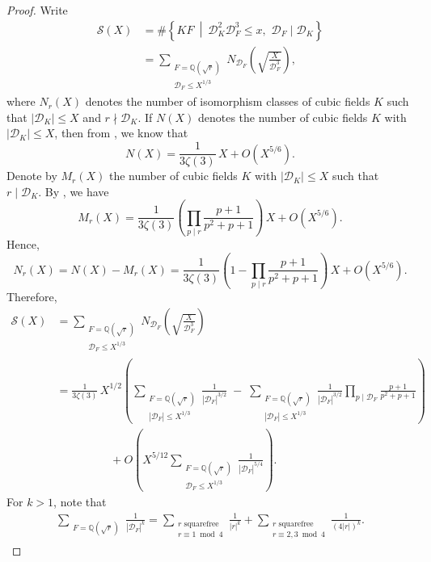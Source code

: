 \documentclass[11pt,reqno]{amsart}
\newcommand{\Q}{\mathbb{Q}}
\newcommand{\cD}{\mathcal{D}}
\newcommand{\cS}{\mathcal{S}}
\theoremstyle{definition}
\theoremstyle{remark}
\begin{document}
\begin{proof}
Write
\begin{align*}
       \cS(X) &= \#\left\{ KF \ \middle| \ \cD_K^2 \cD_F^3 \leq x ,\,\, \cD_F \mid \cD_K\right\} \\
    &=  \sum_{\substack{ F=\Q(\sqrt{r}) \\ \cD_F  \leq X^{1/3}}} N_{\cD_F}\left( \sqrt{ \frac{X}{\cD_F^3}}\right),
\end{align*}
where  $N_r(X)$ denotes the number of isomorphism classes of cubic fields $K$ such that $|\cD_K| \leq X$ and $r \nmid \cD_K$. If $N(X)$ denotes the number of cubic fields $K$ with $|\cD_K|\leq X$, then from \cite[Theorem 1.1]{countingcubicfields}, we know that 
$$
    N(X) = \frac{1}{3\zeta(3)} \, X + O\left(X^{5/6}\right).
$$
Denote by $M_r(X)$ the number of cubic fields $K$ with $|\cD_K|\leq X$ such that $r\mid \cD_K$.  By \cite[Theorem 1.3]{countingcubicfields}, we have 
\[
M_r(X) =  \frac{1}{3\zeta(3)} \left(\prod_{p\mid r}\frac{p+1}{p^2 + p +1}\right)\, X + O\left(X^{5/6}\right).
\]
Hence,
$$
    N_r(X) = N(X) - M_r(X) = \frac{1}{3\zeta(3)} \left(1-\prod_{p\mid r}\frac{p+1}{p^2 + p +1}\right)\, X + O\left(X^{5/6}\right).
$$
Therefore,
\begin{align*}
\cS(X)
  &= 
     \sum_{\substack{F=\Q(\sqrt{r}) \\ \cD_F \le X^{1/3}}}
        N_{\cD_F}\!\left( \sqrt{\frac{X}{\cD_F^{3}}} \right)\\[2pt]  
  &= \frac{1}{3\zeta(3)}\,X^{1/2}
     \left(
        \sum_{\substack{F=\Q(\sqrt{r}) \\ |\cD_F| \le X^{1/3}}}
          \frac{1}{|\cD_F|^{3/2}}
        \;-\;
        \sum_{\substack{F=\Q(\sqrt{r}) \\ |\cD_F| \le X^{1/3}}}
          \frac{1}{|\cD_F|^{3/2}}
          \prod_{p\mid\cD_F} \frac{p+1}{p^{2}+p+1}
     \right)\\[2pt]
     &\hspace{2cm}+ O\!\left(
         X^{5/12}
         \sum_{\substack{F=\Q(\sqrt{r}) \\ \cD_F \le X^{1/3}}}
           \frac{1}{|\cD_F|^{5/4}}
       \right).
\end{align*}
For $k>1$, note that
\begin{align*}
    \sum_{\substack{F=\Q(\sqrt{r})}} \frac{1}{|\cD_F|^{k}} = \sum_{\substack{r\text{ squarefree}\\r\equiv 1\bmod 4}} \frac{1}{|r|^k} + \sum_{\substack{r\text{ squarefree}\\r\equiv 2,3\bmod 4}} \frac{1}{(4|r|)^k}.
\end{align*}

\end{proof}
\end{document}
